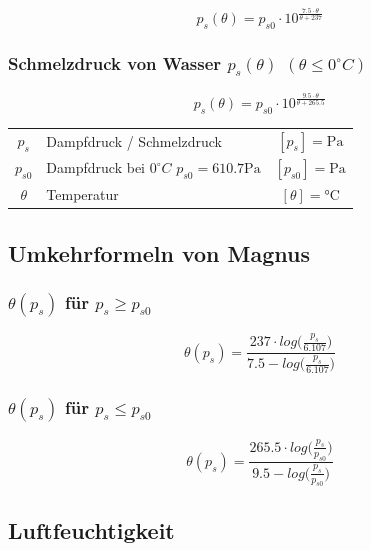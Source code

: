 $$ \boxed{ p_s(\theta) = p_{s0} \cdot 10^{ \frac{7.5 \cdot \theta}{\theta + 237}  } } $$



\subsubsection{Schmelzdruck von Wasser $p_s(\theta)$ $ (\theta \leq 0 ^{\circ}C)$}

$$ \boxed{ p_s(\theta) = p_{s0} \cdot 10^{ \frac{9.5 \cdot \theta}{\theta + 265.5} } } $$



\begin{tabular}{c l c}
	$p_s$ & Dampfdruck / Schmelzdruck & $[p_s] = \mathrm{Pa}$ \\
	$p_{s0}$ & Dampfdruck bei $0^{\circ}C$ \quad $p_{s0} = 610.7 \mathrm{Pa} $ & $[p_{s0}] = \mathrm{Pa}$ \\
	$\theta$ & Temperatur & $[\theta] = \text{°C}$ \\
	
\end{tabular}




\subsection{Umkehrformeln von Magnus}

\subsubsection{$\theta(p_s)$ für $p_s \geq p_{s0}$}


$$ \boxed{ \theta(p_s) = \frac{237 \cdot log \big( \frac{p_s}{6.107} \big)  }{7.5 - log \big( \frac{p_s}{6.107} \big)} } $$



\subsubsection{$\theta(p_s)$ für $p_s \leq p_{s0}$}

$$ \boxed{ \theta(p_s) = \frac{265.5 \cdot log \big( \frac{p_s}{p_{s0}} \big)  }{9.5 - log \big( \frac{p_s}{p_{s0}} \big)} } $$




\subsection{Luftfeuchtigkeit}

